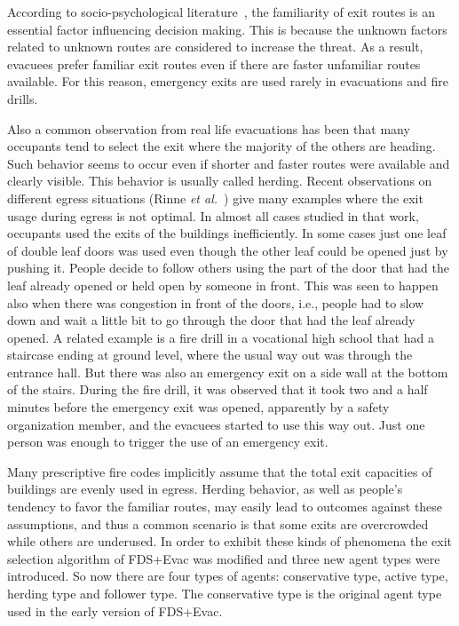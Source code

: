\documentclass[12pt,a4paper,final,twoside]{stylevk}
\begin{document}
\noindent According to socio-psychological
literature~\cite{Pan06,Proulx1993}, the familiarity of exit routes is
an essential factor influencing decision making.  This is because the
unknown factors related to unknown routes are considered to increase
the threat.  As a result, evacuees prefer familiar exit routes even if
there are faster unfamiliar routes available.  For this reason,
emergency exits are used rarely in evacuations and fire drills.


Also a common observation from real life evacuations has been that
many occupants tend to select the exit where the majority of the
others are heading.  Such behavior seems to occur even if shorter and
faster routes were available and clearly visible. This behavior is
usually called herding. Recent observations on different egress
situations (Rinne \emph{et al.}~\cite{Rinne10}) give many examples
where the exit usage during egress is not optimal.  In almost all
cases studied in that work, occupants used the exits of the buildings
inefficiently.  In some cases just one leaf of double leaf doors was
used even though the other leaf could be opened just by pushing it.
People decide to follow others using the part of the door that had the
leaf already opened or held open by someone in front.  This was seen
to happen also when there was congestion in front of the doors, i.e.,
people had to slow down and wait a little bit to go through the door
that had the leaf already opened.  A related example is a fire drill
in a vocational high school that had a staircase ending at ground
level, where the usual way out was through the entrance hall.  But
there was also an emergency exit on a side wall at the bottom of the
stairs.  During the fire drill, it was observed that it took two and a
half minutes before the emergency exit was opened, apparently by a
safety organization member, and the evacuees started to use this way
out.  Just one person was enough to trigger the use of an emergency
exit.


Many prescriptive fire codes implicitly assume that the total exit capacities of buildings are evenly used in egress.  Herding behavior, as well as people's tendency to favor the familiar routes, may easily lead to
outcomes against these assumptions, and thus a common scenario is that some exits are overcrowded while others are underused.  In order to exhibit these kinds of phenomena the exit selection algorithm of FDS+Evac was modified and three new agent types were introduced.  So now there are four types of agents: conservative type, active type, herding type and follower type.  The conservative type is the original agent type used in the early version of FDS+Evac.  
\end{document}
